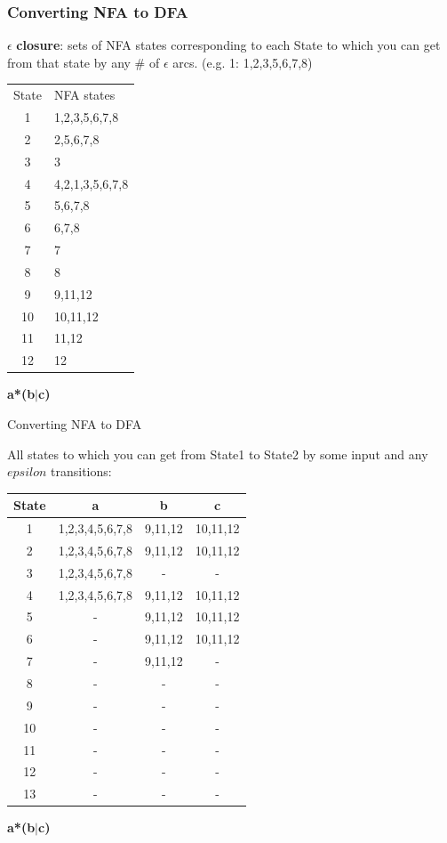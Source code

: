 \documentclass{beamer}
\begin{document}
\begin{frame}
\frametitle{Converting NFA to DFA}

$\epsilon$ \textbf{closure}: sets of NFA states corresponding to each State 
to which you can get from that state by any \# of $\epsilon$ arcs. (e.g. 1: 1,2,3,5,6,7,8)
\vspace{0.5cm}

\small
\begin{tabular}{c|l}
State &  NFA states \\
1 & 1,2,3,5,6,7,8 \\
 2 & 2,5,6,7,8 \\
 3 & 3\\
 4 & 4,2,1,3,5,6,7,8\\
 5 & 5,6,7,8 \\
 6 & 6,7,8 \\
 7 & 7\\
 8 & 8 \\
 9 & 9,11,12 \\
 10 & 10,11,12\\
 11 & 11,12\\
 12 & 12\\
 
\end{tabular}
\hspace{1cm} \textbf{a*(b$\vert$c)}
\end{frame}

\begin{frame}{Converting NFA to DFA}

All states to which you can get from State1 to State2 by some input and any $epsilon$ transitions:
\vspace{0.5cm}

\small
\begin{tabular}{c|ccc}
State &  a & b & c \\
\hline
1 & 1,2,3,4,5,6,7,8& 9,11,12 & 10,11,12\\
 2 & 1,2,3,4,5,6,7,8& 9,11,12 & 10,11,12 \\
 3 & 1,2,3,4,5,6,7,8& - & - \\
 4 & 1,2,3,4,5,6,7,8& 9,11,12 & 10,11,12\\
 5 & - &9,11,12 & 10,11,12\\
 6 & - & 9,11,12 & 10,11,12 \\
 7& - & 9,11,12 & - \\
 8 & - & - & - \\
 9 & - & - & -\\
 10 & - & - & -\\
 11 & - & - & -\\
 12 & - & - & -\\
 13 & - & - & - \\
\end{tabular}
\hspace{1cm} \textbf{a*(b$\vert$c)}

\end{frame}
\end{document}
